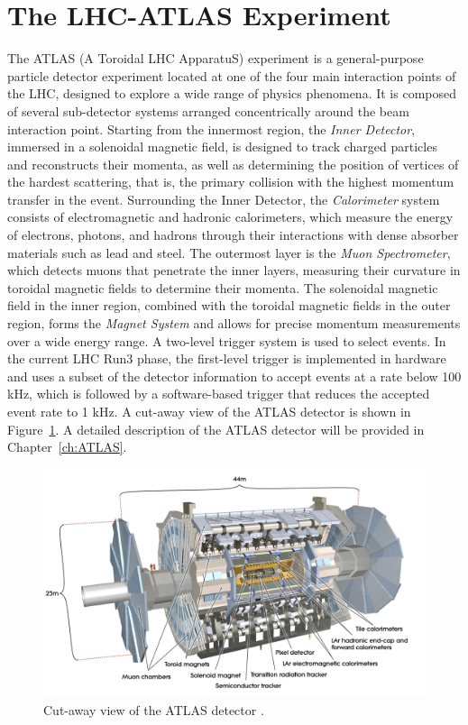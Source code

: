 \section{The LHC-ATLAS Experiment} \label{ATLAS}
The ATLAS (A Toroidal LHC ApparatuS) experiment is a general-purpose particle detector experiment located at one of the four main interaction points of the LHC, designed to explore a wide range of physics phenomena. It is composed of several sub-detector systems arranged concentrically around the beam interaction point. Starting from the innermost region, the \textit{Inner Detector}, immersed in a solenoidal magnetic field, is designed to track charged particles and reconstructs their momenta, as well as determining the position of vertices of the hardest scattering, that is, the primary collision with the highest momentum transfer in the event. Surrounding the Inner Detector, the \textit{Calorimeter} system consists of electromagnetic and hadronic calorimeters, which measure the energy of electrons, photons, and hadrons through their interactions with dense absorber materials such as lead and steel. The outermost layer is the \textit{Muon Spectrometer}, which detects muons that penetrate the inner layers, measuring their curvature in toroidal magnetic fields to determine their momenta. The solenoidal magnetic field in the inner region, combined with the toroidal magnetic fields in the outer region, forms the \textit{Magnet System} and allows for precise momentum measurements over a wide energy range. A two-level trigger system is used to select events. In the current LHC Run3 phase, the first-level trigger is implemented in hardware and uses a subset of the detector information to accept events at a rate below 100 kHz, which is followed by a software-based trigger that reduces the accepted event rate to 1 kHz. A cut-away view of the ATLAS detector is shown in Figure~\ref{fig:ATLASDetector}. A detailed description of the ATLAS detector will be provided in Chapter~\ref{ch:ATLAS}.
\begin{figure}[htbp]
  \centering
  \includegraphics[width=1.0\textwidth]{figs/chapter1/ATLAS.png}
  \caption{Cut-away view of the ATLAS detector \cite{ATLASDetector2008}.}
  \label{fig:ATLASDetector}
\end{figure}
